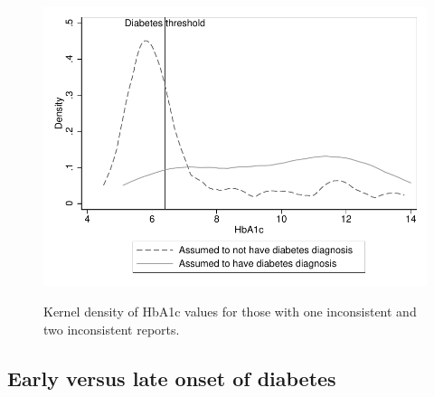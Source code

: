 \documentclass[12pt,english]{article}
\begin{document}
\begin{figure}[h!]
	\caption{\label{fig:kdens_inconsistency_hba1c}Kernel density of HbA1c values for those with one inconsistent and two inconsistent reports.}%
	\begin{center}
		\includegraphics[width=.7\linewidth]{figures/FigureS1.pdf}\\
	\end{center}
\end{figure}


\clearpage

\subsection*{Early versus late onset of diabetes}
\end{document}
